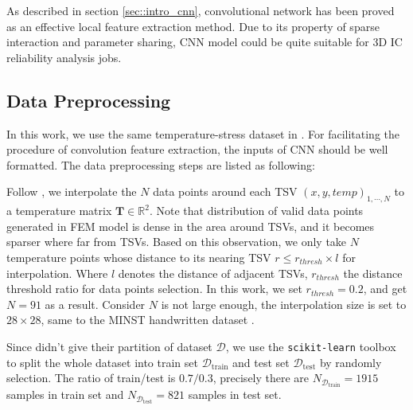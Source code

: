 As described in section \ref{sec::intro_cnn}, convolutional network has been proved as
an effective local feature extraction method. Due to its property of sparse interaction
and parameter sharing, CNN model could be quite suitable for 3D IC reliability analysis jobs.

\subsection{Data Preprocessing}
In this work, we use the same temperature-stress dataset in \cite{Zhang2016Fast}. 
For facilitating the procedure of convolution feature extraction, 
the inputs of CNN should be well formatted. 
The data preprocessing steps are listed as following:

\begin{description}[labelsep=0.5em]
    \item[Data Interpolation] Follow \cite{Zhang2016Fast}, we interpolate the $N$ data points 
    around each TSV $\left(x,y,temp\right)_{1,\cdots,N}$
    to a temperature matrix $\mathbf{T}\in\mathbb{R}^2$.
    Note that distribution of valid data points generated in FEM model is dense in
    the area around TSVs, and it becomes sparser where far from TSVs.
    Based on this observation, we only take $N$ temperature points whose distance to its nearing TSV 
    $r \le r_{thresh} \times l$ for interpolation. Where $l$ denotes the distance of adjacent TSVs,
    $r_{thresh}$ the distance threshold ratio for data points selection. \label{itm::interp}
    In this work, we set $r_{thresh}=0.2$, and get $N=91$ as a result.
    Consider $N$ is not large enough, the interpolation size is set to $28\times28$,
    same to the MINST handwritten dataset \cite{lecun1998gradient}.
       
    \item[Train-Test Splitting] Since \cite{Zhang2016Fast} didn't give their partition of dataset $\mathcal{D}$,
    we use the \texttt{scikit-learn} toolbox to split the whole dataset into 
    train set $\mathcal{D}_{\textrm{train}}$ and test set $\mathcal{D}_{\textrm{test}}$
    by randomly selection.
    The ratio of train/test is $0.7 / 0.3$, precisely there are 
    $N_{\mathcal{D}_{\textrm{train}}}=1915$ samples in train set
    and $N_{\mathcal{D}_{\textrm{test}}}=821$ samples in test set.
    

\end{description}
